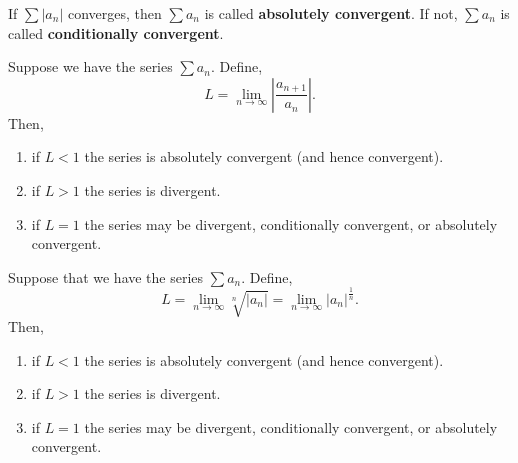 If $\sum |a_n|$ converges, then $\sum a_n$ is called \textbf{absolutely convergent}. If not, $\sum a_n$ is called \textbf{conditionally convergent}.




\begin{thm}
Suppose we have the series $\sum a_{n}$. Define,
$$L=\lim _{n \to \infty} \left|\frac{a_{n+1}}{a_{n}}\right|.$$
Then,
\begin{enumerate}[leftmargin=1em]
    \item if $L<1$ the series is absolutely convergent (and hence convergent).
    \item if $L>1$ the series is divergent.
    \item  if $L=1$ the series may be divergent, conditionally convergent, or absolutely convergent.
\end{enumerate}
\end{thm}

\begin{thm}
Suppose that we have the series $\sum a_{n}$. Define,
$$L=\lim _{n \to \infty} \sqrt[n]{\left|a_{n}\right|}=\lim _{n \rightarrow \infty}\left|a_{n}\right|^{\frac{1}{n}}.$$
Then,
\begin{enumerate}[leftmargin=1em]
    \item if $L<1$ the series is absolutely convergent (and hence convergent).
    \item if $L>1$ the series is divergent.
    \item if $L=1$ the series may be divergent, conditionally convergent, or absolutely convergent.
\end{enumerate}
\end{thm}
